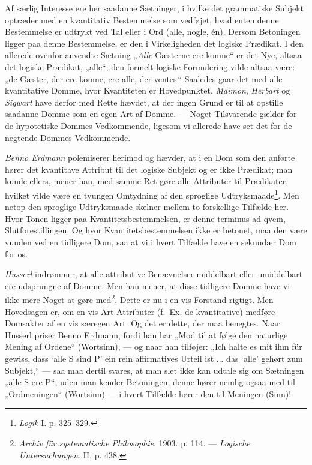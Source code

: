 \documentclass[12pt,a4paper]{book}
\newcommand{\apage}[1]{\marginnote{\footnotesize\textit{[#1]}}}
\begin{document}
Af særlig Interesse ere her saadanne Sætninger, i hvilke det grammatiske
Subjekt optræder med en kvantitativ Bestemmelse som vedføjet, hvad enten
denne Bestemmelse er udtrykt ved Tal eller i Ord (alle, nogle, én).
Dersom Betoningen ligger paa denne Bestemmelse, er den i Virkeligheden
det logiske Prædikat. I den allerede ovenfor anvendte Sætning „\emph{Alle}
Gæsterne ere komne“ er det Nye, altsaa det logiske Prædikat, „alle“; den
formelt logiske Formulering vilde altsaa være: „de Gæster, der ere
komne, ere alle, der ventes.“ Saaledes gaar det med alle kvantitative
Domme, hvor Kvantiteten er Hovedpunktet. \emph{Maimon}, \emph{Herbart}
og \emph{Sigwart} have derfor med Rette hævdet, at der ingen Grund er
til at opstille saadanne Domme som en egen Art af Domme. --- Noget
Tilsvarende gælder for de hypotetiske Dommes Vedkommende, ligesom vi
allerede have set det for de negtende Dommes Vedkommende.

\emph{Benno Erdmann} polemiserer herimod og hævder, at i en Dom som den
anførte hører det kvantitave Attribut til \apage{90} det logiske Subjekt og er
ikke Prædikat; man kunde ellers, mener han, med samme Ret gøre alle
Attributer til Prædikater, hvilket vilde være en tvungen Omtydning af
den sproglige Udtryksmaade\footnote{\emph{Logik} I. p. 325--329.}. Men
netop den sproglige Udtryksmaade skelner mellem to forskellige Tilfælde
her. Hvor Tonen ligger paa Kvantitetsbestemmelsen, er denne terminus ad
qvem, Slutforestillingen. Og hvor Kvantitetsbestemmelsen ikke er
betonet, maa den være vunden ved en tidligere Dom, saa at vi i hvert
Tilfælde have en sekundær Dom for os.

\emph{Husserl} indrømmer, at alle attributive Benævnelser middelbart
eller umiddelbart ere udsprungne af Domme. Men han mener, at disse
tidligere Domme have vi ikke mere Noget at gøre med\footnote{\emph{Archiv
für systematische Philosophie}. 1903. p. 114. --- \emph{Logische
Untersuchungen}. II. p. 438.}. Dette er nu i en vis Forstand rigtigt.
Men Hovedsagen er, om en vis Art Attributer (f.\ Ex. de kvantitative)
medføre Domsakter af en vis særegen Art. Og det er dette, der maa
benegtes. Naar Husserl priser Benno Erdmann, fordi han har „Mod til at
følge den naturlige Mening af Ordene“ (Wortsinn), --- og naar han
tilføjer: „Ich halte es mit ihm für gewiss, dass ‘alle S sind P’ ein
rein affirmatives Urteil ist ... das ‘alle’ gehørt zum Subjekt,“ --- saa
maa dertil svares, at man slet ikke kan udtale sig om Sætningen „alle S
ere P“, uden man kender Betoningen; denne hører nemlig ogsaa med til
„Ordmeningen“ (Wortsinn) --- i hvert Tilfælde hører den til Meningen
(Sinn)!
\end{document}
